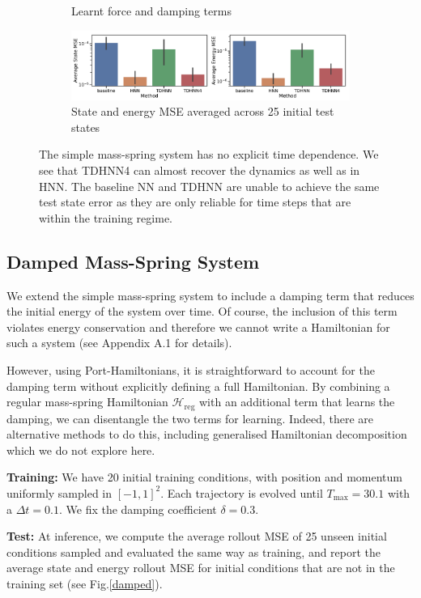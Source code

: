 \documentclass{article}
\begin{document}
\begin{figure}[h!]
\begin{subfigure}[b]{0.48\textwidth}
		\caption{Learnt force and damping terms}
	\end{subfigure}
	\begin{subfigure}[b]{0.48\textwidth}
	    \centering
		\includegraphics[width=\textwidth]{figures/figures/mass_spring/1/mass_spring_errors_0.pdf}
		\caption{State and energy MSE averaged across 25 initial test states}
	\end{subfigure}
\caption{The simple mass-spring system has no explicit time dependence. We see that TDHNN4 can almost recover the dynamics as well as in HNN. The baseline NN and TDHNN are unable to achieve the same test state error as they are only reliable for time steps that are within the training regime.}
\label{mspring}
\end{figure}


\subsection{Damped Mass-Spring System}

We extend the simple mass-spring system to include a damping term that reduces the initial energy of the system over time. Of course, the inclusion of this term violates energy conservation and therefore we cannot write a Hamiltonian for such a system (see Appendix A.1 for details). 

However, using Port-Hamiltonians, it is straightforward to account for the damping term without explicitly defining a full Hamiltonian. By combining a regular mass-spring Hamiltonian $\mathcal{H}_{\mathrm{reg}}$ with an additional term that learns the damping, we can disentangle the two terms for learning. Indeed, there are alternative methods to do this, including generalised Hamiltonian decomposition which we do not explore here.

\textbf{Training:} We have 20 initial training conditions, with position and momentum uniformly sampled in $[-1,1]^2$. Each trajectory is evolved until $T_{\max} = 30.1$ with a $\Delta t = 0.1$. We fix the damping coefficient $\delta = 0.3$.

\textbf{Test:} At inference, we compute the average rollout MSE of 25 unseen initial conditions sampled and evaluated the same way as training, and report the average state and energy rollout MSE for initial conditions that are not in the training set (see Fig.\ref{damped}).
\end{document}
